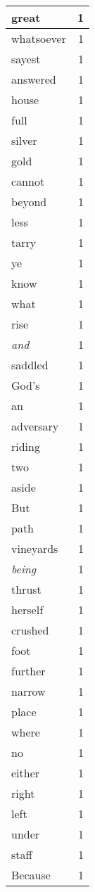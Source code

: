 \begin{center}
\begin{longtable}{l|r}
great & 1\\ \hline 
whatsoever & 1\\ \hline 
sayest & 1\\ \hline 
answered & 1\\ \hline 
house & 1\\ \hline 
full & 1\\ \hline 
silver & 1\\ \hline 
gold & 1\\ \hline 
cannot & 1\\ \hline 
beyond & 1\\ \hline 
less & 1\\ \hline 
tarry & 1\\ \hline 
ye & 1\\ \hline 
know & 1\\ \hline 
what & 1\\ \hline 
rise & 1\\ \hline 
\emph{and} & 1\\ \hline 
saddled & 1\\ \hline 
God's & 1\\ \hline 
an & 1\\ \hline 
adversary & 1\\ \hline 
riding & 1\\ \hline 
two & 1\\ \hline 
aside & 1\\ \hline 
But & 1\\ \hline 
path & 1\\ \hline 
vineyards & 1\\ \hline 
\emph{being} & 1\\ \hline 
thrust & 1\\ \hline 
herself & 1\\ \hline 
crushed & 1\\ \hline 
foot & 1\\ \hline 
further & 1\\ \hline 
narrow & 1\\ \hline 
place & 1\\ \hline 
where & 1\\ \hline 
no & 1\\ \hline 
either & 1\\ \hline 
right & 1\\ \hline 
left & 1\\ \hline 
under & 1\\ \hline 
staff & 1\\ \hline 
Because & 1\\ \hline 

\end{longtable}
\end{center}
